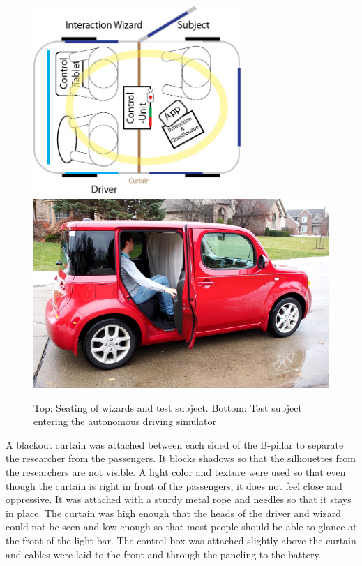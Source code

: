 \begin{figure}
    \includegraphics[width=0.7\textwidth]{fig/test-setup-hori}\hfill\includegraphics[width=\textwidth]{fig/enter.png}
    \caption[Driving Simulator]{Top: Seating of wizards and test subject. Bottom: Test subject entering the autonomous driving simulator}
    \label{fig:testsetup}
\end{figure}

A blackout curtain was attached between each sided of the B-pillar to separate the researcher from the passengers. It blocks shadows so that the silhouettes from the researchers are not visible. A light color and texture were used so that even though the curtain is right in front of the passengers, it does not feel close and oppressive. It was attached with a sturdy metal rope and needles so that it stays in place. The curtain was high enough that the heads of the driver and wizard could not be seen and low enough so that most people should be able to glance at the front of the light bar.  The control box was attached slightly above the curtain and cables were laid to the front and through the paneling to the battery. 

